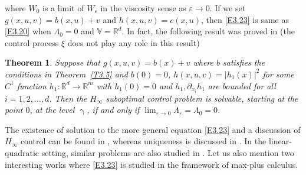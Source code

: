\documentclass[notitlepage,11pt,reqno]{amsart}
\numberwithin{equation}{section}
\theoremstyle{plain}
\newtheorem{theorem}{Theorem}[section]
\theoremstyle{definition}
\theoremstyle{remark}
\newcommand{\RR}{\mathds{R}} %
\newcommand{\Rd}{{\mathds{R}^{d}}}
\begin{document}
where $W_0$ is a limit of $W_\varepsilon$ in the viscosity sense as $\varepsilon\to 0$. If we set $g(x, u, v)=b(x, u) +v$ and $h(x, u, v)=c(x, u)$, then \eqref{E3.23} is same as
\eqref{E3.20} when $\Lambda_0=0$ and $\mathbb{V}=\Rd$. In fact, the following result was proved in \cite[Theorem~2.10]{Fleming-95b} (the control process $\xi$ does not play any role in this result)
\begin{theorem}\label{T3.9}
Suppose that $g(x, u, v)= b(x) + v$ where $b$ satisfies the conditions in Theorem~\ref{T3.5} and $b(0)=0$, $h(x, u, v)=|h_1(x)|^2$ for some $C^1$ function $h_1:\Rd\to\RR^m$ with $h_1(0)=0$ and
$h_1, \partial_{x_i} h_1$ are bounded for all $i=1, 2, \ldots, d$. Then the $H_\infty$ suboptimal control problem is solvable, starting at the point $0$, at the level $\upgamma$, if and only if 
$\lim_{\varepsilon\to 0}\Lambda_\varepsilon=\Lambda_0=0$.
\end{theorem}
The existence of solution to the more general equation \eqref{E3.23} and a  discussion of  $H_\infty$ control can be found in \cite{Fleming-95a,Fleming-01a}, whereas uniqueness
is discussed in \cite{MR1662969}. In the linear-quadratic setting, similar problems are also studied in \cite{MR1453291,MR1612829,MR1715337}. Let us also mention two interesting works
\cite{MR2465707,MR2653896} where \eqref{E3.23} is studied in the framework of max-plus calculus.
\end{document}
